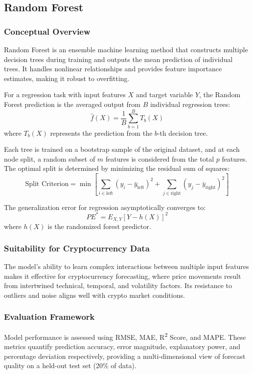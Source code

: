 \documentclass[conference]{IEEEtran}
\begin{document}
\subsection{Random Forest}

\subsubsection{Conceptual Overview}
Random Forest is an ensemble machine learning method that constructs multiple decision trees during training and outputs the mean prediction of individual trees. It handles nonlinear relationships and provides feature importance estimates, making it robust to overfitting.

For a regression task with input features $X$ and target variable $Y$, the Random Forest prediction is the averaged output from $B$ individual regression trees:
$$\hat{f}(X) = \frac{1}{B} \sum_{b=1}^{B} T_b(X)$$
where $T_b(X)$ represents the prediction from the $b$-th decision tree.

Each tree is trained on a bootstrap sample of the original dataset, and at each node split, a random subset of $m$ features is considered from the total $p$ features. The optimal split is determined by minimizing the residual sum of squares:
$$\text{Split Criterion} = \min \left[ \sum_{i \in \text{left}} (y_i - \bar{y}_{\text{left}})^2 + \sum_{j \in \text{right}} (y_j - \bar{y}_{\text{right}})^2 \right]$$

The generalization error for regression asymptotically converges to:
$$PE^* = E_{X,Y}[Y - h(X)]^2$$
where $h(X)$ is the randomized forest predictor.

\subsubsection{Suitability for Cryptocurrency Data}
The model's ability to learn complex interactions between multiple input features makes it effective for cryptocurrency forecasting, where price movements result from intertwined technical, temporal, and volatility factors. Its resistance to outliers and noise aligns well with crypto market conditions.

\subsubsection{Evaluation Framework}
Model performance is assessed using RMSE, MAE, R\textsuperscript{2} Score, and MAPE. These metrics quantify prediction accuracy, error magnitude, explanatory power, and percentage deviation respectively, providing a multi-dimensional view of forecast quality on a held-out test set (20\% of data).
\end{document}
